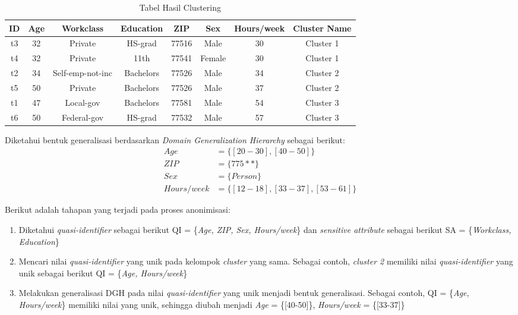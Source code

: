 \documentclass[a4paper,twoside]{article}
\begin{document}
\begin{enumerate}
\begin{table}[H]
\centering
\caption{Tabel Hasil Clustering}
\begin{tabular}{c c c c c c c c}
\hline 
ID & Age & Workclass & Education & ZIP & Sex & Hours/week & Cluster Name\\ 
\hline 
t3 & 32 & Private & HS-grad & 77516 & Male & 30 & Cluster 1 \\ 
t4 & 32 & Private & 11th & 77541 & Female & 30 & Cluster 1 \\ 
\hline 
t2 & 34 & Self-emp-not-inc & Bachelors & 77526 & Male & 34 & Cluster 2 \\ 
t5 & 50 & Private & Bachelors & 77526 & Male & 37	& Cluster 2\\ 
\hline 
t1 & 47 & Local-gov & Bachelors & 77581 & Male & 54 & Cluster 3\\ 
t6 & 50 & Federal-gov & HS-grad & 77532 & Male & 57 & Cluster 3\\ 
\hline 
\end{tabular} 
\label{table:clustering}
\end{table}
\vspace{0.4cm}

\noindent Diketahui bentuk generalisasi berdasarkan \textit{Domain Generalization Hierarchy} sebagai berikut:
\begin{align*}
Age &= \{[20-30], [40-50]\}\\
ZIP &= \{775**\}\\
Sex &= \{Person\}\\
Hours/week &=\{[12-18], [33-37], [53-61]\}
\end{align*} 

\noindent Berikut adalah tahapan yang terjadi pada proses anonimisasi:
\begin{enumerate}

\item Diketahui \textit{quasi-identifier} sebagai berikut QI = \{\textit{Age, ZIP, Sex, Hours/week}\} dan \textit{sensitive attribute} sebagai berikut SA = \{\textit{Workclass, Education}\}

\item Mencari nilai \textit{quasi-identifier} yang unik pada kelompok \textit{cluster} yang sama. Sebagai contoh, \textit{cluster 2} memiliki nilai \textit{quasi-identifier} yang unik sebagai berikut QI = \{\textit{Age, Hours/week}\}

\item Melakukan generalisasi DGH pada nilai \textit{quasi-identifier} yang unik menjadi bentuk generalisasi. Sebagai contoh, QI = \{\textit{Age, Hours/week}\} memiliki nilai yang unik, sehingga diubah menjadi \textit{Age} = \{[40-50]\}, \textit{Hours/week} = \{[33-37]\}


\end{enumerate}
\end{enumerate}
\end{document}
